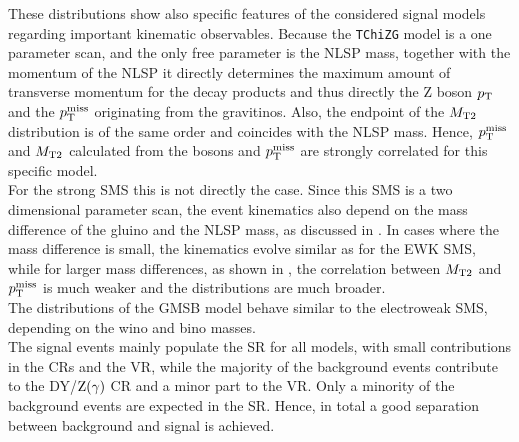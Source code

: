 These distributions show also specific features of the considered signal models regarding important kinematic observables. Because the \texttt{TChiZG} model is a one parameter scan, and the only free parameter is the NLSP mass, together with the momentum of the NLSP it directly determines the maximum amount of transverse momentum for the decay products and thus directly the Z boson $p_{\mathrm{T}}$ and the $p_{\mathrm{T}}^\text{miss}$ originating from the gravitinos. Also, the endpoint of the $M_{\mathrm{T2}}$ distribution is of the same order and coincides with the NLSP mass. Hence, $p_{\mathrm{T}}^\text{miss}$ and $M_{\mathrm{T2}}$ calculated from the bosons and $p_{\mathrm{T}}^\text{miss}$ are strongly correlated for this specific model.\\
For the strong SMS this is not directly the case. Since this SMS is a two dimensional parameter scan, the event kinematics also depend on the mass difference of the gluino and the NLSP mass, as discussed in . In cases where the mass difference is small, the kinematics evolve similar as for the EWK SMS, while for larger mass differences, as shown in , the correlation between $M_{\mathrm{T2}}$ and $p_{\mathrm{T}}^\text{miss}$ is much weaker and the distributions are much broader.\\
The distributions of the GMSB model behave similar to the electroweak SMS, depending on the wino and bino masses.\\
The signal events mainly populate the SR for all models, with small contributions in the CRs and the VR, while the majority of the background events contribute to the DY/$\mathrm{Z}(\gamma)$ CR and a minor part to the VR. Only a minority of the background events are expected in the SR. Hence, in total a good separation between background and signal is achieved.

